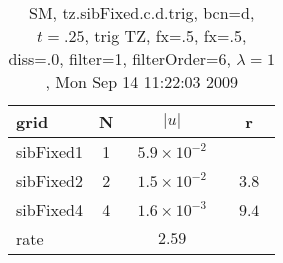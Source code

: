 \begin{table}[hbt]\tableFont %
\begin{center}
\begin{tabular}{|l|c|c|c|} \hline 
grid  & N &  $\vert u \vert$   & r \\ \hline 
           sibFixed1 &     1 & ~$5.9\times10^{ -2}$~ &            \\ \hline
           sibFixed2 &     2 & ~$1.5\times10^{ -2}$~ & ~$  3.8$~  \\ \hline
           sibFixed4 &     4 & ~$1.6\times10^{ -3}$~ & ~$  9.4$~  \\ \hline
    rate             &       &       $2.59$         &        \\ \hline
\end{tabular}
\caption{SM, tz.sibFixed.c.d.trig, bcn=d, $t=.25$, trig TZ, fx=.5, fx=.5, diss=.0, filter=1, filterOrder=6, $\lambda=1$, Mon Sep 14 11:22:03 2009}\label{table:tz.sibFixed.c.d.trig}
\end{center}
\end{table}
